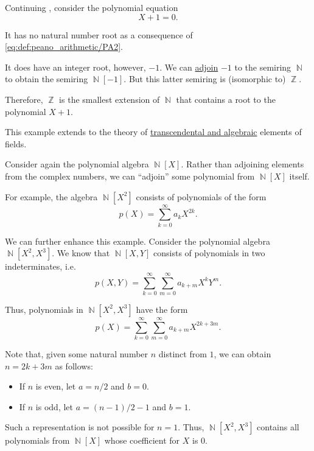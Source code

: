 \begin{example}\label{ex:adjoining_root}
  Continuing , consider the polynomial equation
  \begin{equation*}
    X + 1 = 0.
  \end{equation*}

  It has no natural number root as a consequence of \eqref{eq:def:peano_arithmetic/PA2}.

  It does have an integer root, however, \( -1 \). We can \hyperref[thm:adjoining_elements_to_semiring]{adjoin} \( -1 \) to the semiring \( \BbbN \) to obtain the semiring \( \BbbN[-1] \). But this latter semiring is (isomorphic to) \( \BbbZ \).

  Therefore, \( \BbbZ \) is the smallest extension of \( \BbbN \) that contains a root to the polynomial \( X + 1 \).

  This example extends to the theory of \hyperref[def:transcendental_element]{transcendental and algebraic} elements of fields.
\end{example}

\begin{example}\label{ex:adjoining_polynomial}
  Consider again the polynomial algebra \( \BbbN[X] \). Rather than adjoining elements from the complex numbers, we can \enquote{adjoin} some polynomial from \( \BbbN[X] \) itself.

  For example, the algebra \( \BbbN[X^2] \) consists of polynomials of the form
  \begin{equation*}
    p(X) = \sum_{k=0}^\infty a_k X^{2k}.
  \end{equation*}

  We can further enhance this example. Consider the polynomial algebra \( \BbbN[X^2, X^3] \). We know that \( \BbbN[X, Y] \) consists of polynomials in two indeterminates, i.e.
  \begin{equation*}
    p(X, Y) = \sum_{k=0}^\infty \sum_{m=0}^\infty a_{k+m} X^k Y^m.
  \end{equation*}

  Thus, polynomials in \( \BbbN[X^2, X^3] \) have the form
  \begin{equation*}
    p(X) = \sum_{k=0}^\infty \sum_{m=0}^\infty a_{k+m} X^{2k + 3m}.
  \end{equation*}

  Note that, given some natural number \( n \) distinct from \( 1 \), we can obtain \( n = 2k + 3m \) as follows:
  \begin{itemize}
    \item If \( n \) is even, let \( a = n / 2 \) and \( b = 0 \).
    \item If \( n \) is odd, let \( a = (n - 1) / 2 - 1 \) and \( b = 1 \).
  \end{itemize}

  Such a representation is not possible for \( n = 1 \). Thus, \( \BbbN[X^2, X^3] \) contains all polynomials from \( \BbbN[X] \) whose coefficient for \( X \) is \( 0 \).
\end{example}

